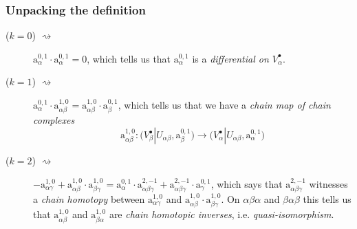 \documentclass{beamer}
\begin{document}
        \begin{frame}\frametitle{Unpacking the definition}
            \begin{description}
                \item[($k=0$) $\rightsquigarrow$] $\mathrm{a}_{\alpha}^{0,1}\cdot\mathrm{a}_{\alpha}^{0,1}=0$, which tells us that $\mathrm{a}_{\alpha}^{0,1}$ is a \emph{differential on $V_\alpha^\bullet$}.
                \pause
                \item[($k=1$) $\rightsquigarrow$] $\mathrm{a}_{\alpha}^{0,1}\cdot\mathrm{a}_{\alpha\beta}^{1,0} = \mathrm{a}_{\alpha\beta}^{1,0}\cdot\mathrm{a}_{\beta}^{0,1}$, which tells us that we have a \emph{chain map of chain complexes}
                    \begin{equation*}
                        \mathrm{a}_{\alpha\beta}^{1,0} \colon \big(V_\beta^\bullet|U_{\alpha\beta},\mathrm{a}_\beta^{0,1}\big) \to \big(V_\alpha^\bullet|U_{\alpha\beta},\mathrm{a}_\alpha^{0,1}\big)
                    \end{equation*}
                \vspace{-1.5em}
                \pause
                \item[($k=2$) $\rightsquigarrow$] $-\mathrm{a}_{\alpha\gamma}^{1,0} + \mathrm{a}_{\alpha\beta}^{1,0}\cdot\mathrm{a}_{\beta\gamma}^{1,0} = \mathrm{a}_{\alpha}^{0,1}\cdot\mathrm{a}_{\alpha\beta\gamma}^{2,-1} + \mathrm{a}_{\alpha\beta\gamma}^{2,-1}\cdot\mathrm{a}_{\gamma}^{0,1}$, which says that $\mathrm{a}_{\alpha\beta\gamma}^{2,-1}$ witnesses a \emph{chain homotopy} between $\mathrm{a}_{\alpha\gamma}^{1,0}$ and $\mathrm{a}_{\alpha\beta}^{1,0}\cdot\mathrm{a}_{\beta\gamma}^{1,0}$.
                    On $\alpha\beta\alpha$ and $\beta\alpha\beta$ this tells us that $\mathrm{a}_{\alpha\beta}^{1,0}$ and $\mathrm{a}_{\beta\alpha}^{1,0}$ are \emph{chain homotopic inverses}, i.e. \emph{quasi-isomorphism}.
            \end{description}
        \end{frame}
\end{document}
